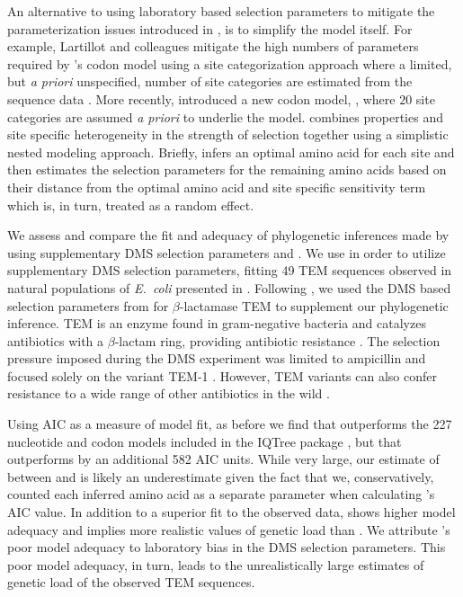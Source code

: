 \documentclass[fleqn,letterpaper]{article}
\begin{document}
An alternative to using laboratory based selection parameters to mitigate the parameterization issues introduced in \hb, is to simplify the \hb model itself.
For example, Lartillot and colleagues mitigate the high numbers of  parameters required by \hb's codon model using a site categorization approach where a limited, but \emph{a priori} unspecified, number of site categories are estimated from the sequence data \citep{LartillotAndPhilippe2004,le2008,RodrigueEtAl2008,RodrigueAndLartillot2014}.
More recently, \citep{beaulieu2019} introduced a new codon model, \selac, where $20$ site categories are assumed \emph{a priori} to underlie the \hb model.
\selac combines \PC properties and site specific heterogeneity in the strength of selection together using a simplistic nested modeling approach.
Briefly, \selac infers an optimal amino acid for each site and then estimates the selection parameters for the remaining amino acids based on their \PC distance from the optimal amino acid and site specific sensitivity term which is, in turn, treated as a random effect.

We assess and compare the fit and adequacy of phylogenetic inferences made by \phydms using supplementary DMS selection parameters and \selac. 
We use \phydms \citep{hilton2017} in order to utilize supplementary DMS selection parameters, fitting 49 TEM sequences observed in natural populations of \emph{E.~coli} presented in \citet{bloom2017}.
Following \citet{bloom2017, hilton2017}, we used the DMS based selection parameters from \citet{stiffler2016} for $\beta$-lactamase TEM to supplement our phylogenetic inference.
TEM is an enzyme found in gram-negative bacteria and catalyzes antibiotics with a $\beta$-lactam ring, providing antibiotic resistance \citep{Neu1969}.
The selection pressure imposed during the DMS experiment was limited to ampicillin and focused solely on the variant TEM-1 \citep{stiffler2016}.
However, TEM variants can also confer resistance to a wide range of other antibiotics in the wild \citep{sougakoff1988,sougakoff1989,goussard1991,mabilat1992,chanal1992,brun1994}.

Using AIC as a measure of model fit, as before we find that \phydms outperforms the 227 nucleotide and codon models included in the IQTree package \citep{bloom2014, bloom2017}, but that \selac outperforms \phydms by an additional 582 AIC units.
While very large, our estimate of \DeltaAIC between \selac and \phydms is likely an underestimate given the fact that we, conservatively, counted each inferred amino acid as a separate parameter when calculating \selac's AIC value.
In addition to a superior fit to the observed data, \selac shows higher model adequacy and implies more realistic values of genetic load than \phydms.
We attribute \phydms's poor model adequacy to laboratory bias in the DMS selection parameters.
This poor model adequacy, in turn, leads to the unrealistically large estimates of genetic load of the observed TEM sequences.
\end{document}
